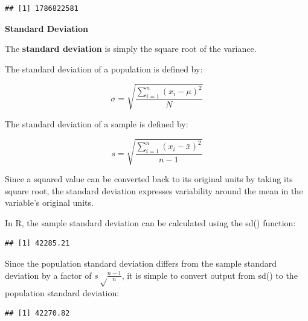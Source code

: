 \documentclass[]{book}
\newenvironment{Shaded}{\begin{snugshade}}{\end{snugshade}}
\newcommand{\CommentTok}[1]{\textcolor[rgb]{0.56,0.35,0.01}{\textit{#1}}}
\newcommand{\DecValTok}[1]{\textcolor[rgb]{0.00,0.00,0.81}{#1}}
\newcommand{\KeywordTok}[1]{\textcolor[rgb]{0.13,0.29,0.53}{\textbf{#1}}}
\newcommand{\NormalTok}[1]{#1}
\newcommand{\OperatorTok}[1]{\textcolor[rgb]{0.81,0.36,0.00}{\textbf{#1}}}
\newcommand{\StringTok}[1]{\textcolor[rgb]{0.31,0.60,0.02}{#1}}
\begin{document}
\begin{verbatim}
## [1] 1786822581
\end{verbatim}

\textbf{Standard Deviation}

The \textbf{standard deviation} is simply the square root of the variance.

The standard deviation of a population is defined by:

\[ \sigma = \sqrt{\frac{\displaystyle\sum_{i=1}^{n} (x_{i} - \mu)^{2}}{N}} \]

The standard deviation of a sample is defined by:

\[ s = \sqrt{\frac{\displaystyle\sum_{i=1}^{n} (x_{i} - \bar{x})^{2}}{n - 1}} \]

Since a squared value can be converted back to its original units by taking its square root, the standard deviation expresses variability around the mean in the variable's original units.

In R, the sample standard deviation can be calculated using the sd() function:

\begin{Shaded}
\end{Shaded}

\begin{verbatim}
## [1] 42285.21
\end{verbatim}

Since the population standard deviation differs from the sample standard deviation by a factor of \(s \sqrt \frac{n - 1}{n}\), it is simple to convert output from sd() to the population standard deviation:

\begin{Shaded}
\end{Shaded}

\begin{verbatim}
## [1] 42270.82
\end{verbatim}
\end{document}

